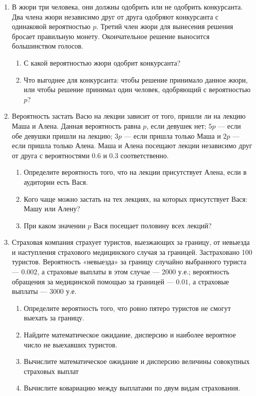 \begin{enumerate}

\item В жюри три человека, они должны одобрить или не одобрить конкурсанта. Два члена жюри независимо друг от друга одобряют конкурсанта с одинаковой вероятностью $p$. Третий член жюри  для вынесения решения бросает правильную монету. Окончательное решение выносится большинством голосов.
\begin{enumerate}
\item С какой вероятностью жюри одобрит конкурсанта?
\item Что выгоднее для  конкурсанта: чтобы решение принимало данное жюри, или чтобы решение принимал один человек, одобряющий с вероятностью $p$?
\end{enumerate}

\item Вероятность застать Васю на лекции зависит от того, пришли ли на лекцию Маша и Алена. Данная вероятность равна $p$, если девушек нет; $5p$ — если обе девушки пришли на лекцию; $3p$ — если пришла только Маша и $2p$ — если пришла только Алена. Маша и Алена посещают лекции независимо друг от друга с вероятностями $0.6$ и $0.3$ соответственно.
\begin{enumerate}
\item Определите вероятность того, что на лекции присутствует Алена, если в аудитории есть Вася.
\item Кого чаще можно застать на тех лекциях, на которых присутствует Вася: Машу или Алену?
\item При каком значении $p$ Вася посещает половину всех лекций?
\end{enumerate}

\item Страховая компания страхует туристов, выезжающих за границу, от невыезда и наступления страхового медицинского случая за границей. Застраховано 100 туристов. Вероятность «невыезда» за границу случайно выбранного туриста — $0.002$, а страховые выплаты в этом случае — 2000 у.е.; вероятность обращения за медицинской помощью за границей — $0.01$, а страховые выплаты — 3000 у.е.
\begin{enumerate}
\item Определите вероятность того, что ровно пятеро туристов не смогут выехать за границу.
\item Найдите математическое ожидание, дисперсию и наиболее вероятное число не выехавших туристов.
\item Вычислите математическое ожидание и дисперсию величины совокупных страховых выплат
\item Вычислите ковариацию между выплатами по двум видам страхования.
\end{enumerate}


\end{enumerate}

